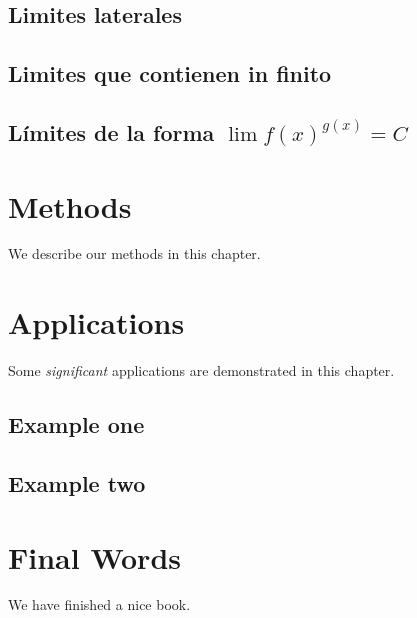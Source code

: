 \documentclass[12pt,]{report}
\theoremstyle{slplain}
\begin{document}
\hypertarget{limites-laterales}{%
\section{Limites laterales}\label{limites-laterales}}

\hypertarget{limites-que-contienen-in-finito}{%
\section{Limites que contienen in finito}\label{limites-que-contienen-in-finito}}

\hypertarget{luxedmites-de-la-forma-lim-fxgxc}{%
\section{\texorpdfstring{Límites de la forma \(\lim f(x)^{g(x)}=C\)}{Límites de la forma \textbackslash{}lim f(x)\^{}\{g(x)\}=C}}\label{luxedmites-de-la-forma-lim-fxgxc}}

\hypertarget{methods}{%
\chapter{Methods}\label{methods}}

We describe our methods in this chapter.

\hypertarget{applications}{%
\chapter{Applications}\label{applications}}

Some \emph{significant} applications are demonstrated in this chapter.

\hypertarget{example-one}{%
\section{Example one}\label{example-one}}

\hypertarget{example-two}{%
\section{Example two}\label{example-two}}

\hypertarget{final-words}{%
\chapter{Final Words}\label{final-words}}

We have finished a nice book.


\end{document}
